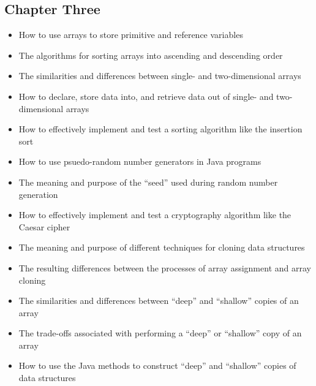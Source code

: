 \documentclass[11pt]{article}
\begin{document}
\vspace*{-.2in}
\subsection*{Chapter Three}

\begin{itemize}

  \item How to use arrays to store primitive and reference variables

  \item The algorithms for sorting arrays into ascending and descending order

  \item The similarities and differences between single- and two-dimensional
    arrays

  \item How to declare, store data into, and retrieve data out of single- and
    two-dimensional arrays

  \item How to effectively implement and test a sorting algorithm like the
    insertion sort

  \item How to use psuedo-random number generators in Java programs

  \item The meaning and purpose of the ``seed'' used during random number
    generation


  \item How to effectively implement and test a cryptography algorithm like the
    Caesar cipher

  \item The meaning and purpose of different techniques for cloning data structures

  \item The resulting differences between the processes of array assignment and
    array cloning

  \item The similarities and differences between ``deep'' and ``shallow'' copies
    of an array

  \item The trade-offs associated with performing a ``deep'' or ``shallow'' copy
    of an array

  \item How to use the Java methods to construct ``deep'' and ``shallow'' copies
    of data structures

\end{itemize}
\end{document}
